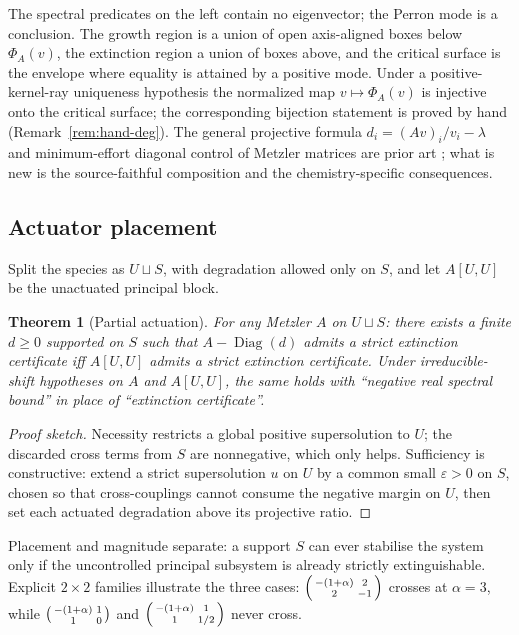 \documentclass[11pt,a4paper]{article}
\theoremstyle{plain}
\newtheorem{theorem}{Theorem}[section]
\theoremstyle{definition}
\theoremstyle{remark}
\newcommand{\Diag}{\operatorname{Diag}}
\begin{document}
The spectral predicates on the left contain no eigenvector; the Perron mode is a conclusion. The growth region is a union of open axis-aligned boxes below $\Phi_A(v)$, the extinction region a union of boxes above, and the critical surface is the envelope where equality is attained by a positive mode. Under a positive-kernel-ray uniqueness hypothesis the normalized map $v\mapsto\Phi_A(v)$ is injective onto the critical surface; the corresponding bijection statement is proved by hand (Remark~\ref{rem:hand-deg}). The general projective formula $d_i=(Av)_i/v_i-\lambda$ and minimum-effort diagonal control of Metzler matrices are prior art \cite{ofir2022}; what is new is the source-faithful composition and the chemistry-specific consequences.

\subsection{Actuator placement}

Split the species as $U\sqcup S$, with degradation allowed only on $S$, and let $A[U,U]$ be the unactuated principal block.

\begin{theorem}[Partial actuation]\label{thm:partial}
For any Metzler $A$ on $U\sqcup S$: there exists a finite $d\ge 0$ supported on $S$ such that $A-\Diag(d)$ admits a strict extinction certificate iff $A[U,U]$ admits a strict extinction certificate. Under irreducible-shift hypotheses on $A$ and $A[U,U]$, the same holds with ``negative real spectral bound'' in place of ``extinction certificate''.
\end{theorem}
\begin{proof}[Proof sketch]
Necessity restricts a global positive supersolution to $U$; the discarded cross terms from $S$ are nonnegative, which only helps. Sufficiency is constructive: extend a strict supersolution $u$ on $U$ by a common small $\varepsilon>0$ on $S$, chosen so that cross-couplings cannot consume the negative margin on $U$, then set each actuated degradation above its projective ratio.
\end{proof}

Placement and magnitude separate: a support $S$ can ever stabilise the system only if the uncontrolled principal subsystem is already strictly extinguishable. Explicit $2\times 2$ families illustrate the three cases: $\begin{psmallmatrix}-(1+\alpha)&2\\2&-1\end{psmallmatrix}$ crosses at $\alpha=3$, while $\begin{psmallmatrix}-(1+\alpha)&1\\1&0\end{psmallmatrix}$ and $\begin{psmallmatrix}-(1+\alpha)&1\\1&1/2\end{psmallmatrix}$ never cross.
\end{document}
